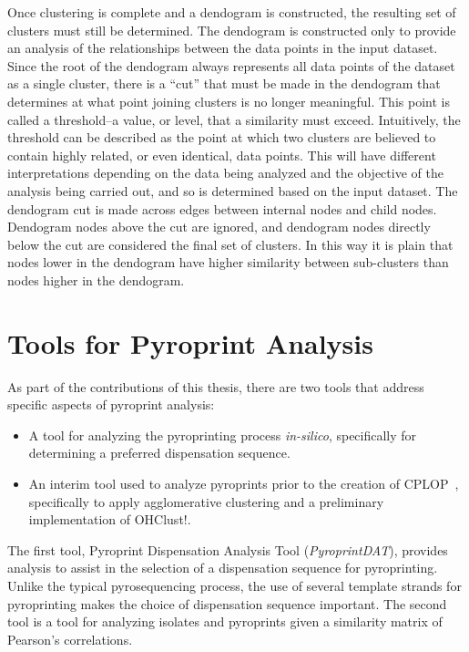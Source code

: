 \documentclass[12pt]{ucthesis}
\begin{document}
         Once clustering is complete and a dendogram is constructed, the
         resulting set of clusters must still be determined. The dendogram is
         constructed only to provide an analysis of the relationships between
         the data points in the input dataset. Since the root of the dendogram
         always represents all data points of the dataset as a single cluster,
         there is a ``cut'' that must be made in the dendogram that determines
         at what point joining clusters is no longer meaningful. This point is
         called a threshold--a value, or level, that a similarity must exceed.
         Intuitively, the threshold can be described as the point at which two
         clusters are believed to contain highly related, or even identical,
         data points. This will have different interpretations depending on the
         data being analyzed and the objective of the analysis being carried
         out, and so is determined based on the input dataset. The dendogram
         cut is made across edges between internal nodes and child nodes.
         Dendogram nodes above the cut are ignored, and dendogram nodes
         directly below the cut are considered the final set of clusters. In
         this way it is plain that nodes lower in the dendogram have higher
         similarity between sub-clusters than nodes higher in the dendogram.

\chapter{Tools for Pyroprint Analysis}\label{chap:other_contributions}
   As part of the contributions of this thesis, there are two tools that
   address specific aspects of pyroprint analysis:
   \begin{itemize}
      \item A tool for analyzing the pyroprinting process \textit{in-silico},
            specifically for determining a preferred dispensation sequence.
      \item An interim tool used to analyze pyroprints prior to the creation of
            CPLOP~\cite{Jan:Thesis}, specifically to apply
            \textsf{agglomerative clustering} and a preliminary implementation
            of OHClust!.
   \end{itemize}
   The first tool, Pyroprint Dispensation Analysis Tool
   (\textit{PyroprintDAT}), provides analysis to assist in the selection of a
   dispensation sequence for pyroprinting. Unlike the typical pyrosequencing
   process, the use of several template strands for pyroprinting makes the
   choice of dispensation sequence important. The second tool is a tool for
   analyzing isolates and pyroprints given a similarity matrix of Pearson's
   correlations.
\end{document}
